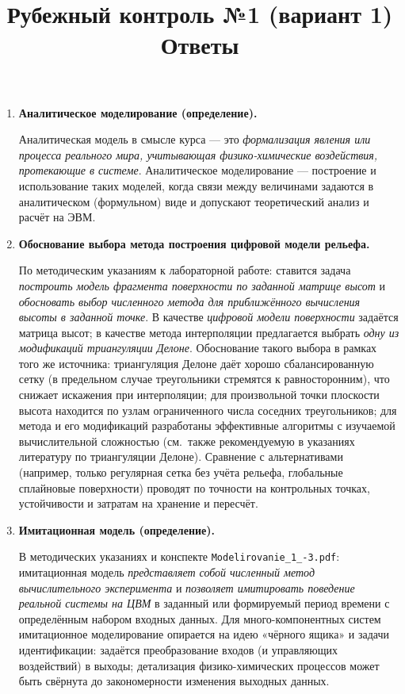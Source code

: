 \documentclass[12pt,a4paper]{article}
\title{Рубежный контроль №1 (вариант 1)\\Ответы}
\author{}
\date{}
\begin{document}
\maketitle

\begin{enumerate}[label=\textbf{\arabic*.}]

\item \textbf{Аналитическое моделирование (определение).}

Аналитическая модель в смысле курса — это \emph{формализация явления или процесса реального мира, учитывающая физико-химические воздействия, протекающие в системе}. Аналитическое моделирование — построение и использование таких моделей, когда связи между величинами задаются в аналитическом (формульном) виде и допускают теоретический анализ и расчёт на ЭВМ.

\item \textbf{Обоснование выбора метода построения цифровой модели рельефа.}

По методическим указаниям к лабораторной работе: ставится задача \emph{построить модель фрагмента поверхности по заданной матрице высот} и \emph{обосновать выбор численного метода для приближённого вычисления высоты в заданной точке}. В качестве \emph{цифровой модели поверхности} задаётся матрица высот; в качестве метода интерполяции предлагается выбрать \emph{одну из модификаций триангуляции Делоне}. Обоснование такого выбора в рамках того же источника: триангуляция Делоне даёт хорошо сбалансированную сетку (в предельном случае треугольники стремятся к равносторонним), что снижает искажения при интерполяции; для произвольной точки плоскости высота находится по узлам ограниченного числа соседних треугольников; для метода и его модификаций разработаны эффективные алгоритмы с изучаемой вычислительной сложностью (см.\ также рекомендуемую в указаниях литературу по триангуляции Делоне). Сравнение с альтернативами (например, только регулярная сетка без учёта рельефа, глобальные сплайновые поверхности) проводят по точности на контрольных точках, устойчивости и затратам на хранение и пересчёт.

\item \textbf{Имитационная модель (определение).}

В методических указаниях и конспекте \texttt{Modelirovanie\_1\_-3.pdf}: имитационная модель \emph{представляет собой численный метод вычислительного эксперимента} и \emph{позволяет имитировать поведение реальной системы на ЦВМ} в заданный или формируемый период времени с определённым набором входных данных. Для много-компонентных систем имитационное моделирование опирается на идею «чёрного ящика» и задачи идентификации: задаётся преобразование входов (и управляющих воздействий) в выходы; детализация физико-химических процессов может быть свёрнута до закономерности изменения выходных данных.


\end{enumerate}
\end{document}
